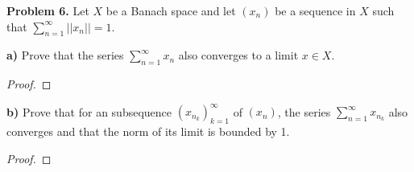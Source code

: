 \documentclass[12pt]{article}
\begin{document}

\textbf{Problem 6.}
Let $X$ be a Banach space and let $(x_n)$ be a sequence in $X$ such that
$\sum_{n=1}^{\infty} ||x_n|| = 1$.

\textbf{a)}
Prove that the series $\sum_{n=1}^{\infty} x_n$ also converges to a limit $x \in X$.
\begin{proof}
\end{proof}

\textbf{b)}
Prove that for an subsequence $(x_{n_k})_{k=1}^{\infty}$ of $(x_n)$, the 
series $\sum_{n=1}^{\infty} x_{n_k}$ also converges and that the norm of
its limit is bounded by 1.
\begin{proof}
\end{proof}
\end{document}
